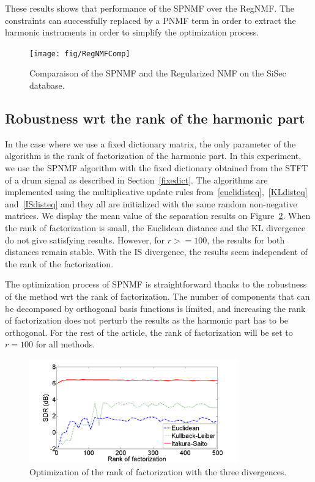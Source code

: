 These results shows that performance of the SPNMF over the RegNMF. The constraints can successfully replaced by a PNMF term in order to extract the harmonic instruments in order to simplify the optimization process. 


\begin{figure}[t]

  \centering 
  \texttt{[image: fig/RegNMFComp]}
  \caption{\label{regnmfcomp} Comparaison of the SPNMF and the Regularized NMF on the SiSec database.}
  
\end{figure}


\subsection{Robustness wrt the rank of the harmonic part}
\label{setup:rank}

In the case where we use a fixed dictionary matrix, the only parameter of the algorithm is the rank of factorization of the harmonic part. In this experiment, we use the SPNMF algorithm with the fixed dictionary obtained from the STFT of a drum signal as described in Section~\ref{fixedict}. The algorithms are implemented using the multiplicative update rules from~\ref{euclidisteq},~\ref{KLdisteq} and~\ref{ISdisteq} and they all are  initialized with the same random non-negative matrices. 
We display the mean value of the separation results on Figure~\ref{RankOfFact}. When the rank of factorization is small, the Euclidean distance and the KL divergence do not give satisfying results. However, for $r>=100$, the results for both distances remain stable. With the IS divergence, the results seem independent of the rank of the factorization.

The optimization process of SPNMF is straightforward thanks to the robustness of the method wrt the rank of factorization. The number of components that can be decomposed by orthogonal basis functions is limited, and increasing the rank of factorization does not perturb the results as the harmonic part has to be orthogonal. For the rest of the article, the rank of factorization will be set to $r=100$ for all methods.



\begin{figure}[t]

  \centering 
  \includegraphics[width=9cm]{fig/RankOfFact}
  \caption{\label{RankOfFact} Optimization of the rank of factorization with the three divergences.}
  
\end{figure}




